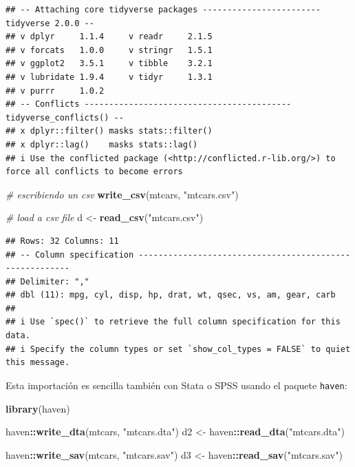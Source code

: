 \documentclass[
]{article}
\newenvironment{Shaded}{\begin{snugshade}}{\end{snugshade}}
\newcommand{\CommentTok}[1]{\textcolor[rgb]{0.56,0.35,0.01}{\textit{#1}}}
\newcommand{\FunctionTok}[1]{\textcolor[rgb]{0.13,0.29,0.53}{\textbf{#1}}}
\newcommand{\NormalTok}[1]{#1}
\newcommand{\OtherTok}[1]{\textcolor[rgb]{0.56,0.35,0.01}{#1}}
\newcommand{\SpecialCharTok}[1]{\textcolor[rgb]{0.81,0.36,0.00}{\textbf{#1}}}
\newcommand{\StringTok}[1]{\textcolor[rgb]{0.31,0.60,0.02}{#1}}
\begin{document}
\begin{verbatim}
## -- Attaching core tidyverse packages ------------------------ tidyverse 2.0.0 --
## v dplyr     1.1.4     v readr     2.1.5
## v forcats   1.0.0     v stringr   1.5.1
## v ggplot2   3.5.1     v tibble    3.2.1
## v lubridate 1.9.4     v tidyr     1.3.1
## v purrr     1.0.2     
## -- Conflicts ------------------------------------------ tidyverse_conflicts() --
## x dplyr::filter() masks stats::filter()
## x dplyr::lag()    masks stats::lag()
## i Use the conflicted package (<http://conflicted.r-lib.org/>) to force all conflicts to become errors
\end{verbatim}

\begin{Shaded}
\begin{Highlighting}[]
\CommentTok{\# escribiendo un csv}
\FunctionTok{write\_csv}\NormalTok{(mtcars, }\StringTok{"mtcars.csv"}\NormalTok{)}

\CommentTok{\# load a csv file}
\NormalTok{d }\OtherTok{\textless{}{-}} \FunctionTok{read\_csv}\NormalTok{(}\StringTok{"mtcars.csv"}\NormalTok{)}
\end{Highlighting}
\end{Shaded}

\begin{verbatim}
## Rows: 32 Columns: 11
## -- Column specification --------------------------------------------------------
## Delimiter: ","
## dbl (11): mpg, cyl, disp, hp, drat, wt, qsec, vs, am, gear, carb
## 
## i Use `spec()` to retrieve the full column specification for this data.
## i Specify the column types or set `show_col_types = FALSE` to quiet this message.
\end{verbatim}

Esta importación es sencilla también con Stata o SPSS usando el paquete
\texttt{haven}:

\begin{Shaded}
\begin{Highlighting}[]
\FunctionTok{library}\NormalTok{(haven)}

\NormalTok{haven}\SpecialCharTok{::}\FunctionTok{write\_dta}\NormalTok{(mtcars, }\StringTok{"mtcars.dta"}\NormalTok{)}
\NormalTok{d2 }\OtherTok{\textless{}{-}}\NormalTok{ haven}\SpecialCharTok{::}\FunctionTok{read\_dta}\NormalTok{(}\StringTok{"mtcars.dta"}\NormalTok{)}

\NormalTok{haven}\SpecialCharTok{::}\FunctionTok{write\_sav}\NormalTok{(mtcars, }\StringTok{"mtcars.sav"}\NormalTok{)}
\NormalTok{d3 }\OtherTok{\textless{}{-}}\NormalTok{ haven}\SpecialCharTok{::}\FunctionTok{read\_sav}\NormalTok{(}\StringTok{"mtcars.sav"}\NormalTok{)}
\end{Highlighting}
\end{Shaded}
\end{document}
